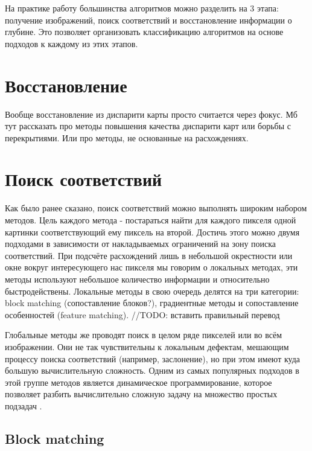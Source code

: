 На практике работу большинства алгоритмов можно разделить на 3 этапа: получение изображений, поиск соответствий и восстановление информации о глубине. Это позволяет
организовать классификацию алгоритмов на основе подходов к каждому из этих этапов. 

\section{Восстановление}

Вообще восстановление из диспарити карты просто считается через фокус. Мб тут рассказать про методы повышения качества диспарити карт или борьбы с перекрытиями. Или про методы, не основанные на расхождениях. 


\section{Поиск соответствий}

Как было ранее сказано, поиск соответствий можно выполнять широким набором методов. Цель каждого метода - постараться найти для каждого пикселя одной картинки 
соответствующий ему пиксель на второй. Достичь этого можно двумя подходами в зависимости от накладываемых ограничений на зону поиска соответствий.  При подсчёте 
расхождений лишь в небольшой окрестности или окне вокруг интересующего нас пикселя мы говорим о локальных методах, эти методы  используют небольшое количество 
информации и относительно быстродействены. Локальные методы в свою очередь делятся на три категории: block matching (сопоставление блоков?), градиентные методы и 
сопоставление особенностей (feature matching). 		//TODO: вставить правильный перевод

Глобальные методы же проводят поиск в целом ряде пикселей или во всём изображении. Они не так чувствительны к локальным дефектам, мешающим процессу поиска соответствий 
(например, заслонение), но при этом имеют куда большую вычислительную сложность. Одним из самых популярных подходов в этой группе методов является динамическое программирование, 
которое позволяет разбить вычислительно сложную задачу на множество простых подзадач \cite{dynamic_prog}.   	 

\subsection{Block matching}

